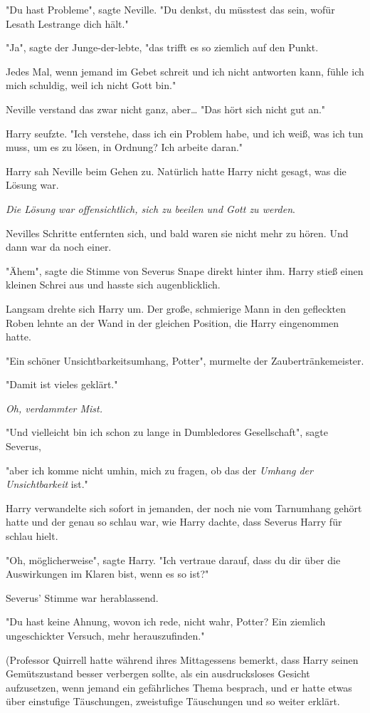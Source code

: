 {"Du hast Probleme", sagte Neville. "Du denkst, du müsstest das sein, wofür Lesath Lestrange dich hält."

"Ja", sagte der Junge-der-lebte, "das trifft es so ziemlich auf den Punkt.

Jedes Mal, wenn jemand im Gebet schreit und ich nicht antworten kann, fühle ich mich schuldig, weil ich nicht Gott bin."

Neville verstand das zwar nicht ganz, aber… "Das hört sich nicht gut an."

Harry seufzte. "Ich verstehe, dass ich ein Problem habe, und ich weiß, was ich tun muss, um es zu lösen, in Ordnung? Ich arbeite daran."

Harry sah Neville beim Gehen zu. Natürlich hatte Harry nicht gesagt, was die Lösung war.

\emph{Die Lösung war offensichtlich, sich zu beeilen und Gott zu werden}.

Nevilles Schritte entfernten sich, und bald waren sie nicht mehr zu hören. Und dann war da noch einer.

"Ähem", sagte die Stimme von Severus Snape direkt hinter ihm. Harry stieß einen kleinen Schrei aus und hasste sich augenblicklich.

Langsam drehte sich Harry um. Der große, schmierige Mann in den gefleckten Roben lehnte an der Wand in der gleichen Position, die Harry eingenommen hatte.

"Ein schöner Unsichtbarkeitsumhang, Potter", murmelte der Zaubertränkemeister.

"Damit ist vieles geklärt."

\emph{Oh, verdammter Mist.}

"Und vielleicht bin ich schon zu lange in Dumbledores Gesellschaft", sagte Severus,

"aber ich komme nicht umhin, mich zu fragen, ob das der \emph{Umhang der Unsichtbarkeit} ist."

Harry verwandelte sich sofort in jemanden, der noch nie vom Tarnumhang gehört hatte und der genau so schlau war, wie Harry dachte, dass Severus Harry für schlau hielt.

"Oh, möglicherweise", sagte Harry. "Ich vertraue darauf, dass du dir über die Auswirkungen im Klaren bist, wenn es so ist?"

Severus' Stimme war herablassend.

"Du hast keine Ahnung, wovon ich rede, nicht wahr, Potter? Ein ziemlich ungeschickter Versuch, mehr herauszufinden."

(Professor Quirrell hatte während ihres Mittagessens bemerkt, dass Harry seinen Gemütszustand besser verbergen sollte, als ein ausdrucksloses Gesicht aufzusetzen, wenn jemand ein gefährliches Thema besprach, und er hatte etwas über einstufige Täuschungen, zweistufige Täuschungen und so weiter erklärt.

}
